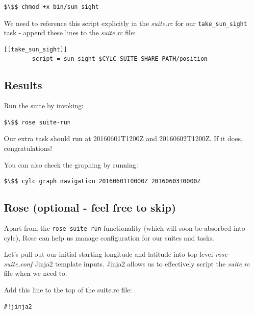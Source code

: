 \begin{lstlisting}[mathescape, language=bash]
$\$$ chmod +x bin/sun_sight
\end{lstlisting}

We need to reference this script explicitly in the {\em suite.rc} for our \lstinline{take_sun_sight} task - append these lines to the {\em suite.rc} file:

\lstset{language=suiterc}
\begin{lstlisting}[columns=fullflexible]
    [[take_sun_sight]]
        script = sun_sight $CYLC_SUITE_SHARE_PATH/position
\end{lstlisting}

\subsection{Results}

Run the suite by invoking:
\begin{lstlisting}[mathescape, language=bash]
$\$$ rose suite-run
\end{lstlisting}

Our extra task should run at 20160601T1200Z and 20160602T1200Z. If it does, congratulations!

You can also check the graphing by running:

\begin{lstlisting}[mathescape, language=bash]
$\$$ cylc graph navigation 20160601T0000Z 20160603T0000Z
\end{lstlisting}

\subsection{Rose (optional - feel free to skip)}
\label{Rose}

Apart from the \lstinline{rose suite-run} functionality (which will soon be absorbed into cylc), Rose can help us manage configuration for our suites and tasks.

Let's pull out our initial starting longitude and latitude into top-level {\em rose-suite.conf} Jinja2 template inputs. Jinja2 allows us to effectively script the {\em suite.rc} file when we need to.

Add this line to the top of the suite.rc file:

\lstset{language=suiterc}
\begin{lstlisting}[columns=fullflexible]
#!jinja2
\end{lstlisting}

